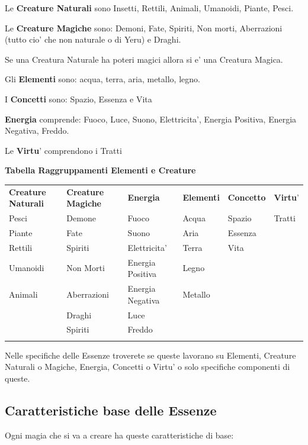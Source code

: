 \documentclass[a4paper,11pt,twoside,openany]{book}
\begin{document}
	Le \textbf{Creature Naturali} sono Insetti, Rettili, Animali, Umanoidi, Piante, Pesci.
	
	Le \textbf{Creature Magiche} sono: Demoni, Fate, Spiriti, Non morti, Aberrazioni (tutto cio' che non naturale o di Yeru) e Draghi.
	
	Se una Creatura Naturale ha poteri magici allora si e' una Creatura Magica.
	
	Gli \textbf{Elementi} sono: acqua, terra, aria, metallo, legno. 
	
	I \textbf{Concetti} sono: Spazio, Essenza e Vita
	
	\textbf{Energia} comprende: Fuoco, Luce, Suono, Elettricita', Energia Positiva, Energia Negativa, Freddo.
	
	Le \textbf{Virtu}' comprendono i Tratti
	
	\bigskip
	
	\textbf{Tabella Raggruppamenti Elementi e Creature}
	
	\medskip
	
	\begin{tabular}{llllll}
		\toprule
		\textbf{Creature Naturali} & \textbf{Creature Magiche} & \textbf{Energia} & \textbf{Elementi} & \textbf{Concetto} & \textbf{Virtu}'\tabularnewline
		Pesci & Demone & Fuoco & Acqua & Spazio & Tratti\tabularnewline
		Piante & Fate & Suono & Aria & Essenza & \tabularnewline
		Rettili & Spiriti & Elettricita' & Terra & Vita & \tabularnewline
		Umanoidi & Non Morti & Energia Positiva & Legno & & \tabularnewline
		Animali & Aberrazioni & Energia Negativa & Metallo & & \tabularnewline
		& Draghi & Luce & & & \tabularnewline
		& Spiriti & Freddo & & & \tabularnewline
		& & & & & \tabularnewline
	\end{tabular}
	
	\bigskip
	
	Nelle specifiche delle Essenze troverete se queste lavorano su Elementi, Creature Naturali o Magiche, Energia, Concetti o Virtu' o solo specifiche componenti di queste.
	
	\subsection{Caratteristiche base delle Essenze}
	
	\label{caratteristiche-base-delle-essenze}
	
	Ogni magia che si va a creare ha queste caratteristiche di base:
	
	\smallskip
	
\end{document}
